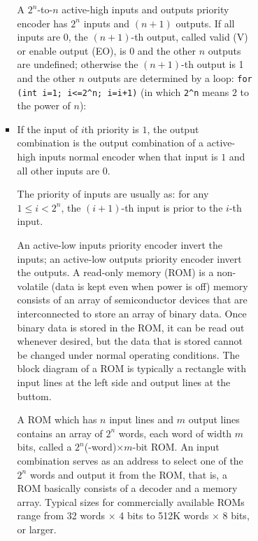 \documentclass[a4paper,12pt]{article}
\begin{document}
\begin{itemize}
\begin{itemize}
\begin{itemize}
\begin{itemize}
\begin{itemize}
\begin{itemize}
\begin{itemize}
A $2^n$-to-$n$ active-high inputs and outputs priority encoder has $2^n$ inputs and $(n+1)$ outputs. If all inputs are 0, the $(n+1)$-th output, called valid (V) or enable output (EO), is 0 and the other $n$ outputs are undefined; otherwise the $(n+1)$-th output is 1 and the other $n$ outputs are determined by a loop: \texttt{for (int i=1; i<=2^n; i=i+1)} (in which \verb|2^n| means $2$ to the power of $n$):
\bit
\item If the input of $i$th priority is $1$, the output combination is the output combination of a active-high inputs normal encoder when that input is $1$ and all other inputs are $0$.
\eit

The priority of inputs are usually as: for any $1\leq i<2^n$, the $(i+1)$-th input is prior to the $i$-th input.

An active-low inputs priority encoder invert the inputs; an active-low outputs priority encoder invert the outputs.
A read-only memory (ROM) is a non-volatile (data is kept even when power is off) memory consists of an array of semiconductor devices that are interconnected to store an array of binary data. Once binary data is stored in the ROM, it can be read out whenever desired, but the data that is stored cannot be changed under normal operating conditions. The block diagram of a ROM is typically a rectangle with input lines at the left side and output lines at the buttom.

A ROM which has $n$ input lines and $m$ output lines contains an array of $2^n$ words, each word of width $m$ bits, called a $2^n$(-word)$\times m$-bit ROM. An input combination serves as an address to select one of the $2^n$ words and output it from the ROM, that is, a ROM basically consists of a decoder and a memory array. Typical sizes for commercially available ROMs range from 32 words $\times$ 4 bits to 512K words $\times$ 8 bits, or larger.


\end{itemize}
\end{itemize}
\end{itemize}
\end{itemize}
\end{itemize}
\end{itemize}
\end{itemize}
\end{document}
